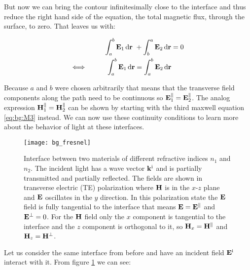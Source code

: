 But now we can bring the contour infinitesimally close to the interface and thus reduce the right hand side of the equation, the total magnetic flux, through the surface, to zero. That leaves us with:

\begin{equation}
\begin{aligned}
    \int_a^b \vb E_1 \, \dd \vb r \ &+ \int_b^a \vb E_2 \,  \dd \vb r = 0\\
    \Longleftrightarrow \hspace{3em}
    \int_a^b \vb E_1 \, \dd \vb r &= \int_a^b \vb E_2 \,  \dd \vb r \\
\end{aligned}
\end{equation}

Because $a$ and $b$ were chosen arbitrarily that means that the transverse field components along the path need to be continuous so
$\vb E_1^{\parallel} = \vb E_2^{\parallel}$.
The analog expression
$\vb H_1^{\parallel} = \vb H_2^{\parallel}$
can be shown by starting with the third maxwell equation \eqref{eq:bg:M3} instead. We can now use these continuity conditions to learn more about the behavior of light at these interfaces.

\begin{figure}[H]
    \centering
    \texttt{[image: bg\_fresnel]}
    \caption{Interface between two materials of different refractive indices $n_1$ and $n_2$. The incident light has a wave vector $\vb k^{\mathrm{i}}$ and is partially transmitted and partially reflected. The fields are shown in transverse electric (TE) polarization where $\vb H$ is in the $x$-$z$ plane and $\vb E$ oscillates in the $y$ direction.
    In this polarization state the $\vb E$ field is fully tangential to the interface that means 
    $\vb E = \vb E^\parallel$ and $\vb E^\bot = 0$.
    For the $\vb H$ field only the $x$ component is tangential to the interface and the $z$ component is orthogonal to it, so 
    $\vb H_x = \vb H^\parallel$ and $\vb H_z = \vb H^\bot$.}
    \label{fig:bg:fresnel}
\end{figure}

Let us consider the same interface from before and have an incident field
$\vb E^{\mathrm{i}}$ interact with it. From figure \ref{fig:bg:fresnel} we can see:

